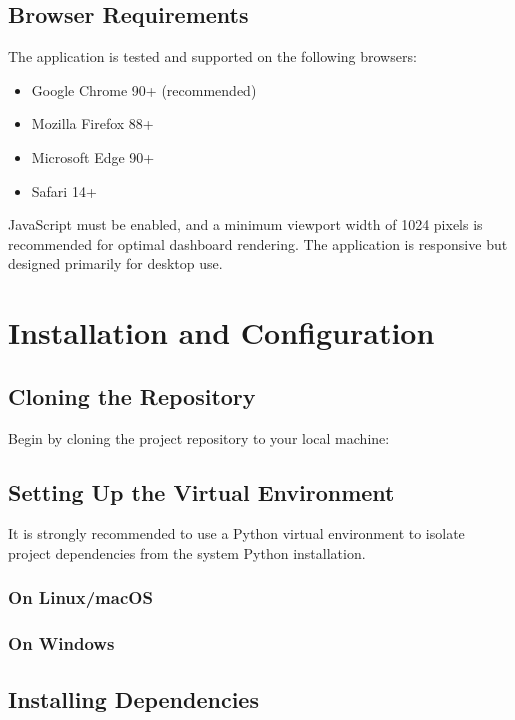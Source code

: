 \subsection{Browser Requirements}

The application is tested and supported on the following browsers:

\begin{itemize}
    \item Google Chrome 90+ (recommended)
    \item Mozilla Firefox 88+
    \item Microsoft Edge 90+
    \item Safari 14+
\end{itemize}

\noindent JavaScript must be enabled, and a minimum viewport width of 1024 pixels is recommended for optimal dashboard rendering. The application is responsive but designed primarily for desktop use.

\section{Installation and Configuration}
\label{sec:user-installation}

\subsection{Cloning the Repository}

Begin by cloning the project repository to your local machine:


\subsection{Setting Up the Virtual Environment}

It is strongly recommended to use a Python virtual environment to isolate project dependencies from the system Python installation.

\subsubsection{On Linux/macOS}


\subsubsection{On Windows}


\subsection{Installing Dependencies}

